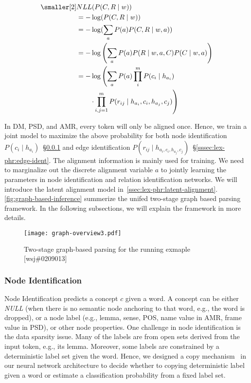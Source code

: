 \begin{equation}
  \label{eq:graph_prob}
\begin{aligned} \smaller[2]
 & NLL(P(C,R \mid w)) \\
 & = - \log(P(C,R \mid w)) \\
 & = - \log(\sum_{a}{P(a) P(C,R \mid w,a)}) \\
 & = - \log\left(\sum_{a}P(a) P(R\mid w,a,C) P(C \mid w, a)\right) \\
 & = - \log\left(\sum_{a}P(a) \prod_{i}^{m} P(c_{i} \mid h_{a_{i}}) \right. \\
 & \qquad \left.\cdot \prod_{i,j=1}^{m}P(r_{ij} \mid h_{a_{i}}, c_{i}, h_{a_{j}}, c_{j})\right)
\end{aligned}
\end{equation}

In DM, PSD, and AMR, every token will only be aligned once.  Hence, we
train a joint model to maximize the above probability for both node
identification
$P(c_{i} \mid h_{a_{i}})$~\S\ref{sssec:lex-phr:node-ident} and edge
identification
$P(r_{ij} \mid h_{{a_{i}}, c_{i},h_{a_{j}},
  c_{j}})$~\S\ref{sssec:lex-phr:edge-ident}. The alignment
information is mainly used for training. We need to marginalize out
the discrete alignment variable $a$ to jointly learning the parameters
in node identification and relation identification networks. We will
introduce the latent alignment model
in~\autoref{ssec:lex-phr:latent-alignment}. \autoref{fig:graph-based-inference}
summerize the unifed two-stage graph based parsing framework. In the
following subsections, we will explain the framework in more details.

\begin{figure}[h] \centering
  \texttt{[image: graph-overview3.pdf]}
  \caption{\label{fig:graph-based-inference} Two-stage graph-based
    parsing for the running exmaple [wsj\#0209013]}
\end{figure}

\subsubsection{Node Identification}
\label{sssec:lex-phr:node-ident}
Node Identification predicts a concept $c$ given a word. A
concept can be either {\it NULL} (when there is no semantic node
anchoring to that word, e.g., the word is dropped), or a node label
(e.g., lemma, sense, POS, name value in AMR, frame value in PSD), or
other node properties. One challenge in node identification is the
data sparsity issue. Many of the labels are from open sets derived
from the input token, e.g., its lemma.  Moreover, some labels are
constrained by a deterministic label set given the word. Hence, we
designed a copy mechanism~\citep{luong2014addressing} in our neural
network architecture to decide whether to copying deterministic label
given a word or estimate a classification probability from a fixed
label set.


